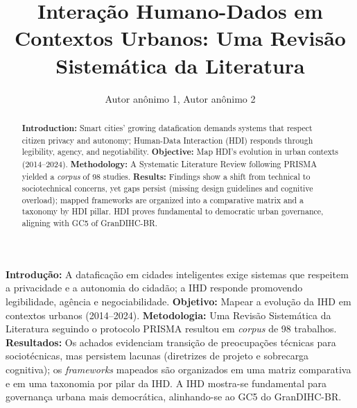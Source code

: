 \documentclass[12pt]{article}
\title{Interação Humano-Dados em Contextos Urbanos: Uma Revisão Sistemática da Literatura} %
\author{Autor anônimo 1, Autor anônimo 2}
\begin{document}
 


\maketitle

\thispagestyle{plain}

\begin{abstract}{
\textbf{Introduction:} Smart cities' growing datafication demands systems that respect citizen privacy and autonomy; Human-Data Interaction (HDI) responds through legibility, agency, and negotiability. \textbf{Objective:} Map HDI's evolution in urban contexts (2014--2024). \textbf{Methodology:} A Systematic Literature Review following PRISMA yielded a \textit{corpus} of 98 studies. \textbf{Results:} Findings show a shift from technical to sociotechnical concerns, yet gaps persist (missing design guidelines and cognitive overload); mapped frameworks are organized into a comparative matrix and a taxonomy by HDI pillar. HDI proves fundamental to democratic urban governance, aligning with GC5 of GranDIHC-BR.}
\end{abstract}

     

\begin{resumo}{
  \textbf{Introdução:} A dataficação em cidades inteligentes exige sistemas que respeitem a privacidade e a autonomia do cidadão; a IHD responde promovendo legibilidade, agência e negociabilidade. \textbf{Objetivo:} Mapear a evolução da IHD em contextos urbanos (2014--2024). \textbf{Metodologia:} Uma Revisão Sistemática da Literatura seguindo o protocolo PRISMA resultou em \textit{corpus} de 98 trabalhos. \textbf{Resultados:} Os achados evidenciam transição de preocupações técnicas para sociotécnicas, mas persistem lacunas (diretrizes de projeto e sobrecarga cognitiva); os \textit{frameworks} mapeados são organizados em uma matriz comparativa e em uma taxonomia por pilar da IHD. A IHD mostra-se fundamental para governança urbana mais democrática, alinhando-se ao GC5 do GranDIHC-BR.}
\end{resumo}

\end{document}
